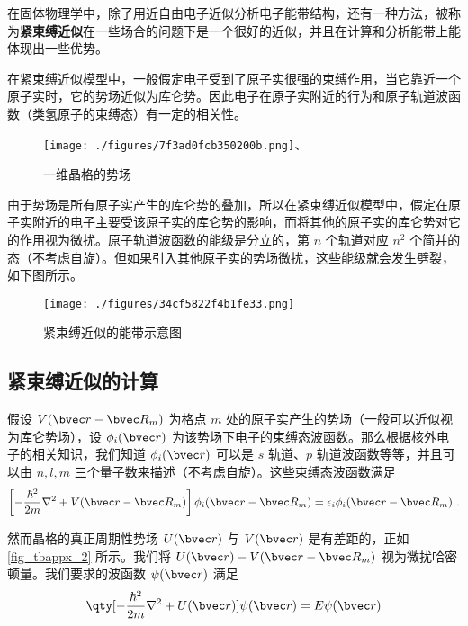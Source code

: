 

在固体物理学中，除了用近自由电子近似分析电子能带结构，还有一种方法，被称为\textbf{紧束缚近似}在一些场合的问题下是一个很好的近似，并且在计算和分析能带上能体现出一些优势。

在紧束缚近似模型中，一般假定电子受到了原子实很强的束缚作用，当它靠近一个原子实时，它的势场近似为库仑势。因此电子在原子实附近的行为和原子轨道波函数（类氢原子的束缚态）有一定的相关性。
\begin{figure}[ht]
\centering
\texttt{[image: ./figures/7f3ad0fcb350200b.png]}、
\caption{一维晶格的势场} \label{fig_tbappx_2}
\end{figure}


由于势场是所有原子实产生的库仑势的叠加，所以在紧束缚近似模型中，假定在原子实附近的电子主要受该原子实的库仑势的影响，而将其他的原子实的库仑势对它的作用视为微扰。原子轨道波函数的能级是分立的，第 $n$ 个轨道对应 $n^2$ 个简并的态（不考虑自旋）。但如果引入其他原子实的势场微扰，这些能级就会发生劈裂，如下图所示。

\begin{figure}[ht]
\centering
\texttt{[image: ./figures/34cf5822f4b1fe33.png]}
\caption{紧束缚近似的能带示意图} \label{fig_tbappx_1}
\end{figure}

\subsection{紧束缚近似的计算}

假设 $V(\bvec r-\bvec R_m)$ 为格点 $m$ 处的原子实产生的势场（一般可以近似视为库仑势场），设 $\phi_i(\bvec r)$ 为该势场下电子的束缚态波函数。那么根据核外电子的相关知识，我们知道 $\phi_i(\bvec r)$ 可以是 $s$ 轨道、$p$ 轨道波函数等等，并且可以由 $n,l,m$ 三个量子数来描述（不考虑自旋）。这些束缚态波函数满足
\begin{equation}
\left[-\frac{\hbar^2}{2m}\nabla^2+V(\bvec r-\bvec R_m)\right]\phi_i(\bvec r-\bvec R_m)=\epsilon_i\phi_i(\bvec r-\bvec R_m)~.
\end{equation}

然而晶格的真正周期性势场 $U(\bvec r)$ 与 $V(\bvec r)$ 是有差距的，正如 \autoref{fig_tbappx_2} 所示。我们将 $U(\bvec r)-V(\bvec r-\bvec R_m)$ 视为微扰哈密顿量。我们要求的波函数 $\psi(\bvec r)$ 满足
\begin{equation}\label{eq_tbappx_1}
\qty[-\frac{\hbar^2}{2m}\nabla^2+U(\bvec r)]\psi(\bvec r)=E\psi(\bvec r)
\end{equation}

